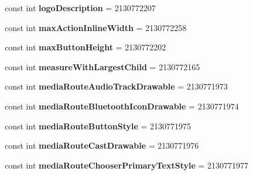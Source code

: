\begin{DoxyCompactItemize}
const int {\bfseries logo\+Description} = 2130772207
\item 
\mbox{\label{class_sample_app_1_1_droid_1_1_resource_1_1_attribute_afcfc5a0e8ae57b5ac194a4f91d755cc9}} 
const int {\bfseries max\+Action\+Inline\+Width} = 2130772258
\item 
\mbox{\label{class_sample_app_1_1_droid_1_1_resource_1_1_attribute_ae57e14e77411184b7803f7a155b294a5}} 
const int {\bfseries max\+Button\+Height} = 2130772202
\item 
\mbox{\label{class_sample_app_1_1_droid_1_1_resource_1_1_attribute_a168ccb94dd7c9c85ccbb1976682e5578}} 
const int {\bfseries measure\+With\+Largest\+Child} = 2130772165
\item 
\mbox{\label{class_sample_app_1_1_droid_1_1_resource_1_1_attribute_a2a4f66208c456764b08d4c6243367216}} 
const int {\bfseries media\+Route\+Audio\+Track\+Drawable} = 2130771973
\item 
\mbox{\label{class_sample_app_1_1_droid_1_1_resource_1_1_attribute_a07cf4cb91a402d997203bc87dd76ceda}} 
const int {\bfseries media\+Route\+Bluetooth\+Icon\+Drawable} = 2130771974
\item 
\mbox{\label{class_sample_app_1_1_droid_1_1_resource_1_1_attribute_a84561f0ff3b72dc73520bc3fefb48832}} 
const int {\bfseries media\+Route\+Button\+Style} = 2130771975
\item 
\mbox{\label{class_sample_app_1_1_droid_1_1_resource_1_1_attribute_a8e5bd8fe3bd2bdcb87743ecd1fb8a9d0}} 
const int {\bfseries media\+Route\+Cast\+Drawable} = 2130771976
\item 
\mbox{\label{class_sample_app_1_1_droid_1_1_resource_1_1_attribute_aa0d6bee0b7c545ee008296b0d1e11bc4}} 
const int {\bfseries media\+Route\+Chooser\+Primary\+Text\+Style} = 2130771977

\end{DoxyCompactItemize}
